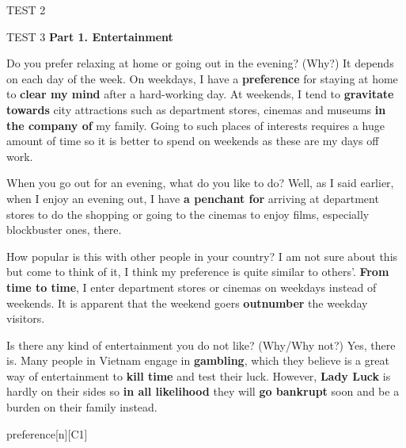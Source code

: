 \begin{glossarymc}[Cambridge 5]
\begin{test}{TEST 2}
    \end{test}

    \begin{test}{TEST 3}
    \noindent
    \textbf{Part 1. Entertainment}

    \begin{qa}{Do you prefer relaxing at home or going out in the evening? (Why?)}
    It depends on each day of the week. On weekdays, I have a \textbf{preference} for staying at home to \textbf{clear my mind} after a hard-working day. At weekends, I tend to \textbf{gravitate towards} city attractions such as department stores, cinemas and museums \textbf{in the company of} my family. Going to such places of interests requires a huge amount of time so it is better to spend on weekends as these are my days off work.
    \end{qa}

    \begin{qa}{When you go out for an evening, what do you like to do?}
    Well, as I said earlier, when I enjoy an evening out, I have \textbf{a penchant for} arriving at department stores to do the shopping or going to the cinemas to enjoy films, especially blockbuster ones, there.
    \end{qa}

    \begin{qa}{How popular is this with other people in your country?}
    I am not sure about this but come to think of it, I think my preference is quite similar to others'. \textbf{From time to time}, I enter department stores or cinemas on weekdays instead of weekends. It is apparent that the weekend goers \textbf{outnumber} the weekday visitors.
    \end{qa}

    \begin{qa}{Is there any kind of entertainment you do not like? (Why/Why not?)}
    Yes, there is. Many people in Vietnam engage in \textbf{gambling}, which they believe is a great way of entertainment to \textbf{kill time} and test their luck. However, \textbf{Lady Luck} is hardly on their sides so \textbf{in all likelihood} they will \textbf{go bankrupt} soon and be a burden on their family instead.
    \end{qa}

        \begin{VocabExplain}[Part 1]
            \begin{ExplainCard}{preference}[n][C1]
            \end{ExplainCard}


\end{VocabExplain}
\end{test}
\end{glossarymc}

